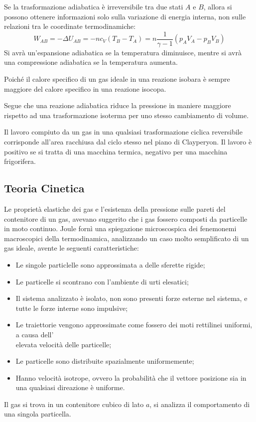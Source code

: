 \documentclass{article}
\numberwithin{equation}{subsection}
\begin{document}
Se la trasformazione adiabatica è irreversibile tra due stati $A$ e $B$, allora si possono ottenere informazioni solo sulla variazione di energia interna, non sulle 
relazioni tra le coordinate termodinamiche:
\begin{equation*}
    W_{AB}=-\Delta U_{AB}=-nc_V(T_B-T_A)=\displaystyle n\frac{1}{\gamma-1}(p_AV_A-p_BV_B)
\end{equation*}
Si avrà un'espansione adiabatica se la temperatura diminuisce, mentre si avrà una compressione adiabatica se la temperatura aumenta. 


Poiché il calore 
specifico di un gas ideale in una reazione isobara è sempre 
maggiore del calore specifico in una reazione isocopa. 


Segue che 
una reazione adiabatica riduce la pressione in maniere maggiore 
rispetto ad una trasformazione isoterma per uno stesso 
cambiamento di volume.


Il lavoro compiuto da un gas in una qualsiasi trasformazione ciclica reversibile corrisponde all'area racchiusa dal ciclo stesso nel piano di Clayperyon. Il lavoro è positivo 
se si tratta di una macchina termica, negativo per una macchina frigorifera. 

\subsection{Teoria Cinetica}


Le proprietà elastiche dei gas e l'esistenza della pressione sulle pareti del contenitore di un gas, avevano suggerito che i gas fossero composti da particelle in moto 
continuo. Joule fornì una spiegazione microscospica 
dei fenemonemi macroscopici della termodinamica, analizzando 
un caso molto semplificato di un gas ideale, avente le seguenti 
caratteristiche:
\begin{itemize}
    \item Le singole particlelle sono approssimata a delle sferette rigide;
    \item Le particelle si scontrano con l'ambiente di urti elesatici;
    \item Il sistema analizzato è isolato, non sono presenti forze 
    esterne nel sistema, e tutte le forze interne sono impulsive;
    \item Le traiettorie vengono approssimate come fossero dei 
    moti rettilinei uniformi, a causa dell'\\elevata velocità 
    delle particelle;
    \item Le particelle sono distribuite spazialmente uniformemente;
    \item Hanno velocità isotrope, ovvero la probabilità che 
    il vettore posizione sia in una qualsiasi direazione è uniforme. 
\end{itemize}
Il gas si trova in un contenitore cubico di lato $a$, 
si analizza il comportamento di una singola particella.
\end{document}
